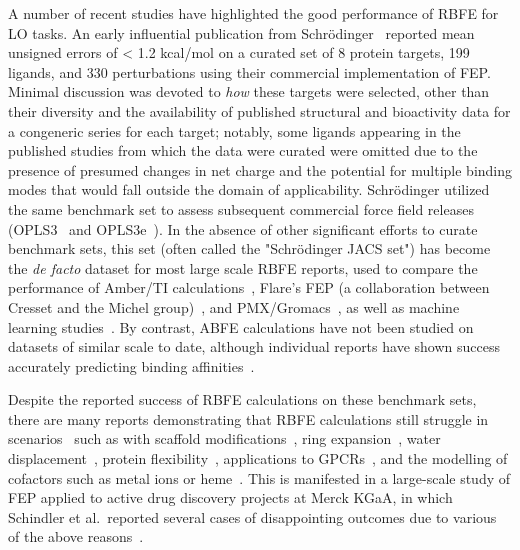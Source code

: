 \documentclass[9pt,bestpractices,pubversion]{livecoms}
\begin{document}
A number of recent studies have highlighted the good performance of RBFE for LO tasks. 
An early influential publication from Schr\"{o}dinger~\cite{wangAccurateReliablePrediction2015} reported mean unsigned errors of < 1.2 kcal/mol on a curated set of 8 protein targets, 199 ligands, and 330 perturbations using their commercial implementation of FEP.
Minimal discussion was devoted to \emph{how} these targets were selected, other than their diversity and the availability of published structural and bioactivity data for a congeneric series for each target; notably, some ligands appearing in the published studies from which the data were curated were omitted due to the presence of presumed changes in net charge and the potential for multiple binding modes that would fall outside the domain of applicability.
Schr\"{o}dinger utilized the same benchmark set to assess subsequent commercial force field releases (OPLS3~\cite{harder_opls3_2016} and OPLS3e~\cite{roos_opls3e_2019}). 
In the absence of other significant efforts to curate benchmark sets, this set (often called the "Schr\"{o}dinger JACS set") has become the \emph{de facto} dataset for most large scale RBFE reports, used to compare the performance of Amber/TI calculations~\cite{songUsingAMBER18Relative2019}, Flare’s FEP (a collaboration between Cresset and the Michel group)~\cite{kuhnAssessmentBindingAffinity2020}, and PMX/Gromacs~\cite{gapsysLargeScaleRelative2020}, as well as machine learning studies~\cite{jimenezDEEPProteinLigand2018,jimenez-lunaDeltaDeltaNeuralNetworks2019}. 
By contrast, ABFE calculations have not been studied on datasets of similar scale to date, although individual reports have shown success accurately predicting binding affinities~\cite{aldeghiLargescaleAnalysisWater2018,courniaRigorousFreeEnergy2020}.

Despite the reported success of RBFE calculations on these benchmark sets, there are many reports demonstrating that RBFE calculations still struggle in scenarios~\cite{sherborne_collaborating_2016} such as with scaffold modifications~\cite{wangAccurateModelingScaffold2017}, ring expansion~\cite{liuRingBreakingFeasible2015}, water displacement~\cite{michel_energetics_2009,brucemacdonald_ligand_2018,ross_enhancing_2020a,ben-shalom_accounting_2020}, protein flexibility~\cite{huang_insights_2012,fratev_improved_2019,singh_absolute_2020}, applications to GPCRs~\cite{lenselink_predicting_2016,deflorian_accurate_2020}, and the modelling of cofactors such as metal ions or heme~\cite{swiderek_binding_2011,ono_improvement_2020}. 
This is manifested in a large-scale study of FEP applied to active drug discovery projects at Merck KGaA, in which Schindler et al.\ reported several cases of disappointing outcomes due to various of the above reasons~\cite{schindler_largescale_2020}. 
\end{document}
